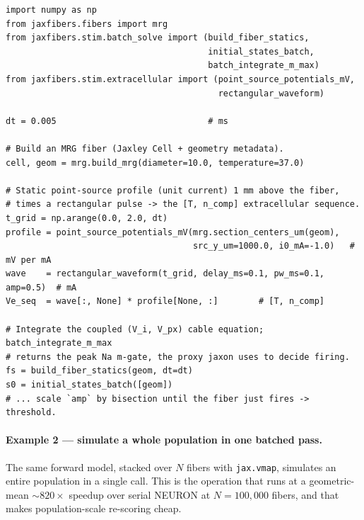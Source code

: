 \documentclass[preprint,12pt,a4paper]{elsarticle}
\begin{document}
{\footnotesize
\begin{verbatim}
import numpy as np
from jaxfibers.fibers import mrg
from jaxfibers.stim.batch_solve import (build_fiber_statics,
                                        initial_states_batch,
                                        batch_integrate_m_max)
from jaxfibers.stim.extracellular import (point_source_potentials_mV,
                                          rectangular_waveform)

dt = 0.005                              # ms

# Build an MRG fiber (Jaxley Cell + geometry metadata).
cell, geom = mrg.build_mrg(diameter=10.0, temperature=37.0)

# Static point-source profile (unit current) 1 mm above the fiber,
# times a rectangular pulse -> the [T, n_comp] extracellular sequence.
t_grid = np.arange(0.0, 2.0, dt)
profile = point_source_potentials_mV(mrg.section_centers_um(geom),
                                     src_y_um=1000.0, i0_mA=-1.0)   # mV per mA
wave    = rectangular_waveform(t_grid, delay_ms=0.1, pw_ms=0.1, amp=0.5)  # mA
Ve_seq  = wave[:, None] * profile[None, :]        # [T, n_comp]

# Integrate the coupled (V_i, V_px) cable equation; batch_integrate_m_max
# returns the peak Na m-gate, the proxy jaxon uses to decide firing.
fs = build_fiber_statics(geom, dt=dt)
s0 = initial_states_batch([geom])
# ... scale `amp` by bisection until the fiber just fires -> threshold.
\end{verbatim}
}

\paragraph{Example 2 --- simulate a whole population in one batched pass.}
The same forward model, stacked over $N$ fibers with \texttt{jax.vmap}, simulates an entire
population in a single call. This is the operation that runs at a geometric-mean
${\sim}820\times$ speedup over serial NEURON at $N=100{,}000$ fibers, and that makes
population-scale re-scoring cheap.
\end{document}
